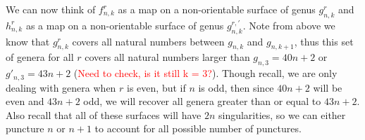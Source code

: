 We can now think of $f^r_{n,k}$ as a map on a non-orientable surface of genus $g^r_{n,k}$ and $h^r_{n,k}$ as a map on a non-orientable surface of genus $g^{r,'}_{n,k}$. Note from above we know that $g^r_{n,k}$ covers all natural numbers between $g_{n,k}$ and $g_{n,k+1}$, thus this set of genera for all $r$ covers all natural numbers larger than $g_{n,3} = 40n + 2$ or $g'_{n,3} = 43n + 2$ (\textcolor{red}{Need to check, is it still k = 3?}). Though recall, we are only dealing with genera when $r$ is even, but if $n$ is odd, then since $40n + 2$ will be even and $43n + 2$ odd, we will recover all genera greater than or equal to $43n + 2$. Also recall that all of these surfaces will have $2n$ singularities, so we can either puncture $n$ or $n + 1$ to account for all possible number of punctures.
